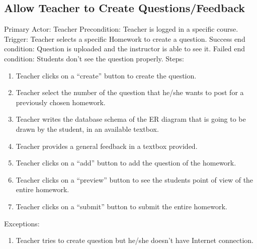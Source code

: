     \subsection{Allow Teacher to Create    Questions/Feedback}
         Primary Actor: Teacher \newline
        Precondition: Teacher is logged in a specific course. \newline
        Trigger: Teacher selects a specific Homework to create a     question. \newline
        Success end condition: Question is uploaded and the instructor is able to see it. \newline
        Failed end condition: Students don’t see the question       properly. \newline
        \newline
        Steps:
        \begin{enumerate}
            \item{Teacher clicks on a “create” button to create the           question.}
            \item{Teacher select the number of the question that             he/she wants to post for a previously chosen               homework.}
            \item{Teacher writes the database schema of the ER              diagram that is going to be drawn by the student, in         an available textbox.}
            \item{Teacher provides a general feedback in a textbox            provided.}
            \item{Teacher clicks on a “add” button to add the                 question of the homework.}
            \item{Teacher clicks on a “preview” button to see the           students point of view of the entire homework.}
            \item{Teacher clicks on a “submit” button to submit the           entire homework.}
        \end{enumerate}
        Exceptions:
        \begin{enumerate}
            \item{Teacher tries to create question but he/she doesn't have Internet connection.}
        \end{enumerate}

    
